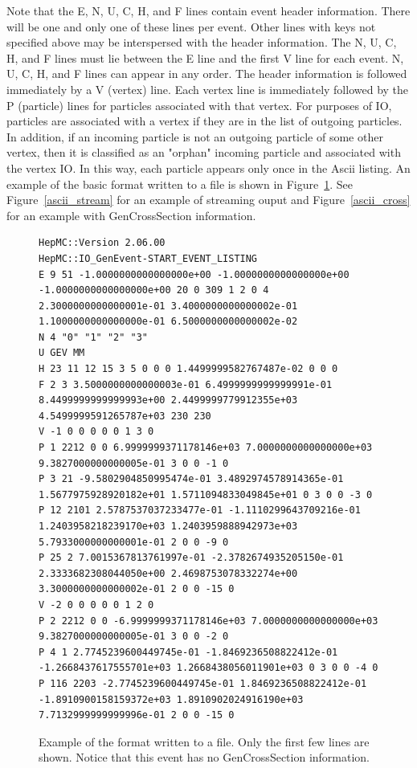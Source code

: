 \documentclass[11pt,letterpaper]{article}
\begin{document}
Note that the E, N, U, C, H, and F lines contain event header information.
There will be one and only one of these lines per event.
Other lines with keys not specified above may be interspersed with the header 
information.
The N, U, C, H, and F lines must lie between the E line and the first V line
for each event.  N, U, C, H, and F lines can appear in any order.
The header information is followed immediately by a V (vertex) line.
Each vertex line is immediately followed by the P (particle) lines 
for particles associated with that vertex.  
For purposes of IO, particles are associated with a vertex if they
are in the list of outgoing particles.
In addition, if an incoming particle is not an outgoing particle of 
some other vertex, then it is classified as an "orphan" incoming particle
and associated with the vertex IO.
In this way, each particle appears only once in the Ascii listing.
An example of the basic format written to a file is shown in Figure~\ref{ascii_format}.
See Figure~\ref{ascii_stream} for an example of streaming ouput and 
Figure~\ref{ascii_cross} for an example with GenCrossSection information.

\begin{figure}[h]
  \begin{center}
{\tiny \begin{verbatim}
HepMC::Version 2.06.00
HepMC::IO_GenEvent-START_EVENT_LISTING
E 9 51 -1.0000000000000000e+00 -1.0000000000000000e+00 -1.0000000000000000e+00 20 0 309 1 2 0 4 2.3000000000000001e-01 3.4000000000000002e-01 1.1000000000000000e-01 6.5000000000000002e-02
N 4 "0" "1" "2" "3" 
U GEV MM
H 23 11 12 15 3 5 0 0 0 1.4499999582767487e-02 0 0 0
F 2 3 3.5000000000000003e-01 6.4999999999999991e-01 8.4499999999999993e+00 2.4499999779912355e+03 4.5499999591265787e+03 230 230
V -1 0 0 0 0 0 1 3 0
P 1 2212 0 0 6.9999999371178146e+03 7.0000000000000000e+03 9.3827000000000005e-01 3 0 0 -1 0
P 3 21 -9.5802904850995474e-01 3.4892974578914365e-01 1.5677975928920182e+01 1.5711094833049845e+01 0 3 0 0 -3 0
P 12 2101 2.5787537037233477e-01 -1.1110299643709216e-01 1.2403958218239170e+03 1.2403959888942973e+03 5.7933000000000001e-01 2 0 0 -9 0
P 25 2 7.0015367813761997e-01 -2.3782674935205150e-01 2.3333682308044050e+00 2.4698753078332274e+00 3.3000000000000002e-01 2 0 0 -15 0
V -2 0 0 0 0 0 1 2 0
P 2 2212 0 0 -6.9999999371178146e+03 7.0000000000000000e+03 9.3827000000000005e-01 3 0 0 -2 0
P 4 1 2.7745239600449745e-01 -1.8469236508822412e-01 -1.2668437617555701e+03 1.2668438056011901e+03 0 3 0 0 -4 0
P 116 2203 -2.7745239600449745e-01 1.8469236508822412e-01 -1.8910900158159372e+03 1.8910902024916190e+03 7.7132999999999996e-01 2 0 0 -15 0
\end{verbatim}}
  \end{center}
  \caption[Example of ascii format]
          {\label{ascii_format} Example of the format written to a file.  
           Only the first few lines are shown. 
	   Notice that this event has no GenCrossSection information. }
\end{figure}
\end{document}
